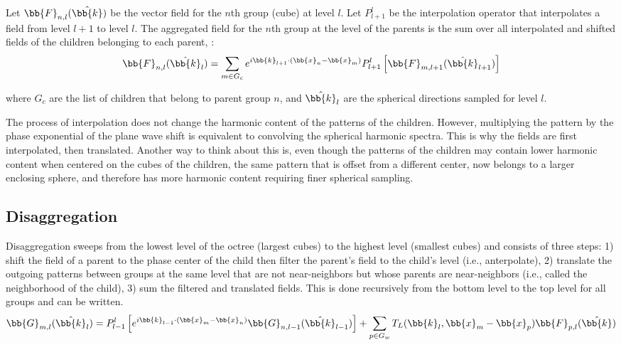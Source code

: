 Let $\bb{F}_{n,l}(\hat {\bb{k}})$ be the vector field for the $n$th group (cube) at level $l$.  Let $P_{l+1}^{l}$ be the interpolation operator that interpolates a field from level $l+1$ to level $l$. The aggregated field for the $n$th group at the level of the parents is the sum over all interpolated and shifted fields of the children belonging to each parent, \cite{yucel2008helmholtz}:
\begin{equation}
\bb{F}_{n,l}(\hat {\bb{k}}_{l}) = \sum_{m \in G_c} e^{i\bb{k}_{l+1} \cdot (\bb{x}_{n} - \bb{x}_{m}) } P_{l+1}^{l}\left[\bb{F}_{m,l+1}(\hat{ \bb{k}}_{l+1})\right]
\end{equation}

\noindent where $G_c$ are the list of children that belong to parent group $n$, and $\hat {\bb{k}}_{l}$ are the spherical directions sampled for level $l$.

The process of interpolation does not change the harmonic content of the patterns of the children. However, multiplying the pattern by the phase exponential of the plane wave shift is equivalent to convolving the spherical harmonic spectra. This is why the fields are first interpolated, then translated. Another way to think about this is, even though the patterns of the children may contain lower harmonic content when centered on the cubes of the children, the same pattern that is offset from a different center, now belongs to a larger enclosing sphere, and therefore has more harmonic content requiring finer spherical sampling.

\subsection{Disaggregation}

Disaggregation sweeps from the lowest level of the octree (largest cubes) to the highest level (smallest cubes) and consists of three steps: 1) shift the field of a parent to the phase center of the child then filter the parent's field to the child's level (i.e., anterpolate), 2) translate the outgoing patterns between groups at the same level that are not near-neighbors but whose parents are near-neighbors (i.e., called the neighborhood of the child), 3) sum the filtered and translated fields. This is done recursively from the bottom level to the top level for all groups and can be written. 
\begin{equation}
\bb{G}_{m,l}(\hat {\bb{k}}_{l}) = P_{l-1}^{l}\left[e^{i\bb{k}_{l-1} \cdot (\bb{x}_{m} - \bb{x}_{n}) }  \bb{G}_{n,l-1}(\hat{ \bb{k}}_{l-1})\right] + \sum_{p \in G_w} T_L({\bb{k}}_{l}, \bb{x}_{m} - \bb{x}_{p}) \bb{F}_{p,l}(\hat {\bb{k}})
\end{equation}


